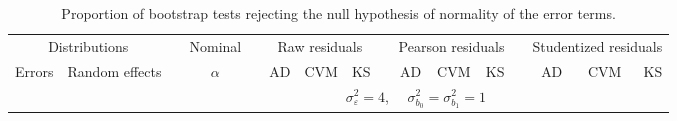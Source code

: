 
\begin{table}[ht]
\centering
\caption{\label{tab:boot1} Proportion of bootstrap tests rejecting the null hypothesis of normality of the error terms.}
\begin{scriptsize}
\begin{tabular}{ll p{.1cm} c p{.1cm} rrr p{.1cm} rrr p{.1cm} rrr}
  \hline
  \multicolumn{2}{c}{Distributions}& & Nominal & &  \multicolumn{3}{c}{Raw residuals} & & \multicolumn{3}{c}{Pearson residuals} & & \multicolumn{3}{c}{Studentized residuals}\\ \cline{1-2} \cline{6-8} \cline{10-12} \cline{14-16}
  Errors & Random effects & & $\alpha$ & & AD & CVM & KS & & AD & CVM & KS & & AD & CVM & KS \\ 
   \hline
& && && \multicolumn{9}{c}{$\sigma_{\varepsilon}^2 = 4$, \ \ $\sigma_{b_0}^2 = \sigma_{b_1}^2 = 1$} \\ \cline{6-16}


\end{tabular}
\end{scriptsize}
\end{table}

